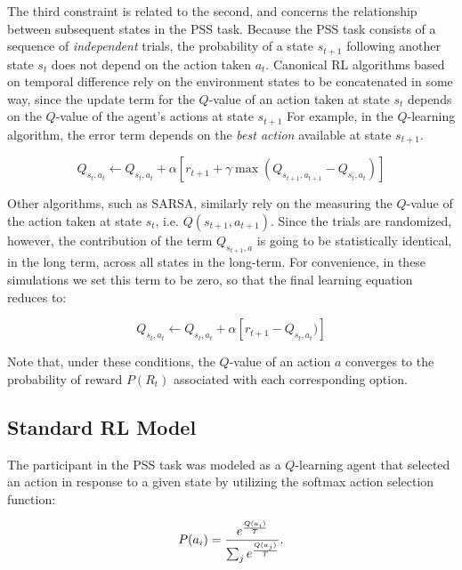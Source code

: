 \documentclass[10pt,letterpaper]{article}
\begin{document}
The third constraint is related to the second, and concerns the relationship between subsequent states in the PSS task. Because the PSS task consists of a sequence of \emph{independent} trials, the probability of a state $s_{t+1}$ following another state $s_{t}$ does not depend on the action taken $a_t$. Canonical RL algorithms based on temporal difference rely on the environment states to be concatenated in some way, since the update term for the $Q$-value of an action taken at state $s_t$ depends on the $Q$-value of the agent's actions at state $s_{t+1}$ For example, in the $Q$-learning algorithm, the error term depends on the \emph{best action} available at state $s_{t+1}$.

\begin{equation}
Q_{s_t,a_t} \leftarrow Q_{s_t,a_t} + \alpha [r_{t+1} + \gamma \max(Q_{s_{t+1}, a_{t+1}} - Q_{s_t,a_t})]
\end{equation}

Other algorithms, such as SARSA, similarly rely on the measuring the $Q$-value of the action taken at state $s_t$, i.e. $Q(s_{t+1}, a_{t+1})$. Since the trials are randomized, however, the contribution of the term $Q_{s_{t+1}, a}$ is going to be statistically identical, in the long term, across all states in the long-term. For convenience, in these simulations we set this term to be zero, so that the final learning equation reduces to:

\begin{equation}
Q_{s_t,a_t} \leftarrow Q_{s_t,a_t} + \alpha [r_{t+1} - Q_{s_t,a_t})]
\end{equation}

Note that, under these conditions, the $Q$-value of an action $a$ converges to the probability of reward $P(R_t)$ associated with each corresponding option.

\subsection{Standard RL Model}


{\color{red} The participant in the PSS task was modeled as a $Q$-learning agent that selected an action in response to a given state by utilizing the softmax action selection function:}

\begin{equation}
P(a_i) = \frac{e^{\frac{Q(a_i)}{T}}}{\sum_{j} e^{\frac{Q(a_j)}{T}}}\\.
\end{equation}
\end{document}
